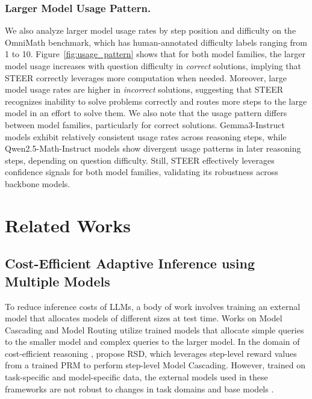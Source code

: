 \documentclass[letterpaper]{article} %
\begin{document}
\subsubsection{Larger Model Usage Pattern.}
We also analyze larger model usage rates by step position and difficulty on the OmniMath benchmark, which has human-annotated difficulty labels ranging from 1 to 10. Figure~\ref{fig:usage_pattern} shows that for both model families, the larger model usage increases with question difficulty in \textit{correct} solutions, implying that STEER correctly leverages more computation when needed. Moreover, large model usage rates are higher in \textit{incorrect} solutions, suggesting that STEER recognizes inability to solve problems correctly and routes more steps to the large model in an effort to solve them. We also note that the usage pattern differs between model families, particularly for correct solutions. Gemma3-Instruct models exhibit relatively consistent usage rates across reasoning steps, while Qwen2.5-Math-Instruct models show divergent usage patterns in later reasoning steps, depending on question difficulty. Still, STEER effectively leverages confidence signals for both model families, validating its robustness across backbone models. 

\section{Related Works}
% 
\subsection{Cost-Efficient Adaptive Inference using Multiple Models}
To reduce inference costs of LLMs, a body of work involves training an external model that allocates models of different sizes at test time. Works on Model Cascading \citep{dohan2022language,chenfrugalgpt,chuang2025learning,narasimhan2025faster} and Model Routing \citep{wang2025mixllm,damani2024learninghardthinkinputadaptive,ong2024routellm} utilize trained models that allocate simple queries to the smaller model and complex queries to the larger model. In the domain of cost-efficient reasoning \citep{sui2025stop}, \citet{liaoreward} propose RSD, which leverages step-level reward values from a trained PRM to perform step-level Model Cascading. However, trained on task-specific and model-specific data, the external models used in these frameworks are not robust to changes in task domains and base models \citep{zeng2025versaprm,zhu-etal-2025-retrieval,ong2024routellm,ding2024hybrid}. 
\end{document}
